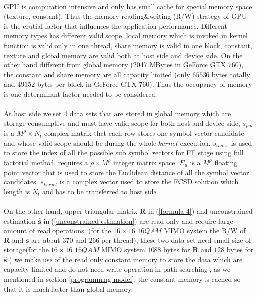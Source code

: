\documentclass[12pt,a4paper,final]{article}
\begin{document}
\begin{spacing}{2.5}
\paragraph{}GPU is computation intensive and only has small cache for special memory space (texture, constant). Thus the memory reading$\&$writing (R/W) strategy of GPU is the crutial factor that influences the application performance. Different memory types has different valid scope, local memory which is invoked in kernel function is valid only in one thread, share memory is valid in one block, constant, texture and global memory are valid both at host side and device side. On the other hand different from global memory (2047 MBytes in GeForce GTX 760), the constant and share memory are all capacity limited (only $65536$ bytes totally and $49152$ bytes per block in GeForce GTX 760). Thus the occupancy of memory is one determinant factor needed to be considered. 
 \paragraph{}At host side we set 4 data sets that are stored in global memory which are storage consumptive and must have valid scope for both host and device side, $\mathit{s_{pm}}$ is a $M^{\rho}\times N_{t}$ complex matrix that each row stores one symbol vector candidate and whose valid scope should be during the whole $\mathit{kernel}$ execution. $\mathit{s_{index}}$ is used to store the index of all the possible sub symbol vectors for  FE stage using full factorial method, requires a $\rho\times M^{\rho}$  integer matrix space.  $\mathit{E_{u}}$ is a $M^{\rho}$ floating point vector that is used to store the Euclidean distance of all the symbol vector candidates. $\mathit{s_{kernel}}$ is a complex vector used to store the FCSD solution which length is $N_{t}$ and has to be transferred to host side. \\
 \paragraph{} On the other hand, upper triangular matrix $\mathbf{R}$ in (\ref{formula 4})  and unconstrained estimation $\mathbf{\hat{s}}$ in (\ref{unconstrained estimation}) are read only and require large amount of read operations. (for the $16\times 16$ $16QAM$ MIMO system the R/W of $\mathbf{R}$  and $\mathbf{\hat{s}}$ are about  $370$ and $266$ per thread), these two data set need small size of storage(for the $16\times 16$ $16QAM$ MIMO system $1088$ bytes for $\mathbf{R}$ and $128$ bytes for $\mathbf{\hat{s}}$  ) we make use of the read only constant memory to store the data which are capacity limited and do not need write operation in path searching , as we mentioned in section \ref{programming model}, the constant memory is cached so that it is much faster than global memory.

\end{spacing}
\end{document}
